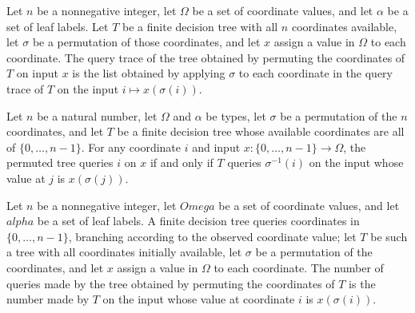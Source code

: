 \begin{theorem}
\label{FABL.FiniteDecisionTree.queryTrace_permuteCoordinates}
\leanok
{}
Let $n$ be a nonnegative integer, let $\Omega$ be a set of coordinate values, and let
$\alpha$ be a set of leaf labels. Let $T$ be a finite decision tree with all $n$
coordinates available, let $\sigma$ be a permutation of those coordinates, and let $x$
assign a value in $\Omega$ to each coordinate. The query trace of the tree obtained by
permuting the coordinates of $T$ on input $x$ is the list obtained by applying $\sigma$
to each coordinate in the query trace of $T$ on the input $i\mapsto x(\sigma(i))$.
\end{theorem}

\begin{theorem}
\label{FABL.FiniteDecisionTree.queries_permuteCoordinates_iff}
\leanok
{}
Let $n$ be a natural number, let $\Omega$ and $\alpha$ be types, let $\sigma$ be a
permutation of the $n$ coordinates, and let $T$ be a finite decision tree whose
available coordinates are all of $\{0,\ldots,n-1\}$. For any coordinate $i$ and input
$x:\{0,\ldots,n-1\}\to\Omega$, the permuted tree queries $i$ on $x$ if and only if $T$
queries $\sigma^{-1}(i)$ on the input whose value at $j$ is $x(\sigma(j))$.
\end{theorem}

\begin{theorem}
\label{FABL.FiniteDecisionTree.queryCount_permuteCoordinates}
\leanok
{}
Let $n$ be a nonnegative integer, let $
Omega$ be a set of coordinate values, and let $
alpha$ be a set of leaf labels. A finite decision tree queries coordinates in
$\{0,\ldots,n-1\}$, branching according to the observed coordinate value; let $T$ be
such a tree with all coordinates initially available, let $\sigma$ be a permutation of
the coordinates, and let $x$ assign a value in $\Omega$ to each coordinate. The number
of queries made by the tree obtained by permuting the coordinates of $T$ is the number
made by $T$ on the input whose value at coordinate $i$ is $x(\sigma(i))$.
\end{theorem}

